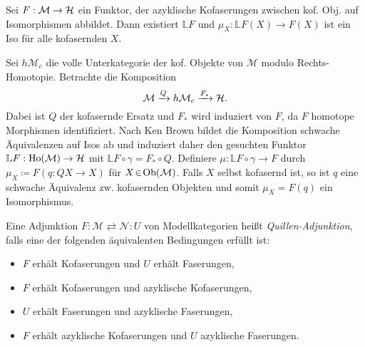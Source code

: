\documentclass{cheat-sheet}
\newcommand{\ModC}{\mathcal{M}} %
\newcommand{\NodC}{\mathcal{N}} %
\DeclareMathOperator{\Ho}{Ho} %
\newcommand{\LD}[1]{\mathbb{L} #1} %
\newenvironment{centertikzcd}
  {\begin{center}\begin{tikzcd}}
  {\end{tikzcd}\end{center}}
\begin{document}
\begin{satz}
  Sei $F : \ModC \to \HatC$ ein Funktor, der azyklische Kofaserungen zwischen kof. Obj. auf Isomorphismen abbildet.
  Dann existiert $\LD{F}$ und $\mu_X : \LD{F}(X) \to F(X)$ ist ein Iso für alle kofasernden $X$.
\end{satz}

\begin{konstr}
  Sei $h \ModC_c$ die volle Unterkategorie der kof. Objekte von $\ModC$ modulo Rechts-Homotopie.
  Betrachte die Komposition
  \[ \ModC \xrightarrow{Q} h \ModC_c \xrightarrow{F_*} \HatC. \]
  Dabei ist $Q$ der kofasernde Ersatz und $F_*$ wird induziert von $F$, da $F$ homotope Morphismen identifiziert.
  Nach Ken Brown bildet die Komposition schwache Äquivalenzen auf Isos ab und induziert daher den gesuchten Funktor $\LD{F} : \Ho(\ModC) \to \HatC$ mit $\LD{F} \circ \gamma = F_* \circ Q$.
  Definiere $\mu : \LD{F} \circ \gamma \!\to\! F$ durch $\mu_X \!\coloneqq\! F(q : QX \!\to\! X)$ für $X \!\in\! \Ob(\ModC)$.
  Falls $X$ selbst kofasernd ist, so ist $q$ eine schwache Äquivalenz zw. kofasernden Objekten und somit $\mu_X = F(q)$ ein Isomorphismus.
\end{konstr}



\begin{defn}
  Eine Adjunktion $F : \ModC \rightleftarrows \NodC : U$ von Modellkategorien heißt \emph{Quillen-Adjunktion}, falls eine der folgenden äquivalenten Bedingungen erfüllt ist:
  \begin{itemize}
    \item $F$ erhält Kofaserungen und $U$ erhält Faserungen,
    \item $F$ erhält Kofaserungen und azyklische Kofaserungen,
    \item $U$ erhält Faserungen und azyklische Faserungen,
    \item $F$ erhält azyklische Kofaserungen und $U$ azyklische Faserungen.
  \end{itemize}
\end{defn}
\end{document}
